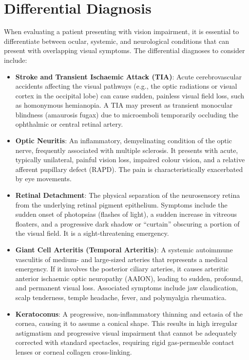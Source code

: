 \section*{Differential Diagnosis}
When evaluating a patient presenting with vision impairment, it is essential to differentiate between ocular, systemic, and neurological conditions that can present with overlapping visual symptoms. The differential diagnoses to consider include:
\begin{itemize}
    \item \textbf{Stroke and Transient Ischaemic Attack (TIA)}: Acute cerebrovascular accidents affecting the visual pathways (e.g., the optic radiations or visual cortex in the occipital lobe) can cause sudden, painless visual field loss, such as homonymous hemianopia. A TIA may present as transient monocular blindness (amaurosis fugax) due to microemboli temporarily occluding the ophthalmic or central retinal artery.
    \item \textbf{Optic Neuritis}: An inflammatory, demyelinating condition of the optic nerve, frequently associated with multiple sclerosis. It presents with acute, typically unilateral, painful vision loss, impaired colour vision, and a relative afferent pupillary defect (RAPD). The pain is characteristically exacerbated by eye movements.
    \item \textbf{Retinal Detachment}: The physical separation of the neurosensory retina from the underlying retinal pigment epithelium. Symptoms include the sudden onset of photopsias (flashes of light), a sudden increase in vitreous floaters, and a progressive dark shadow or ``curtain'' obscuring a portion of the visual field. It is a sight-threatening emergency.
    \item \textbf{Giant Cell Arteritis (Temporal Arteritis)}: A systemic autoimmune vasculitis of medium- and large-sized arteries that represents a medical emergency. If it involves the posterior ciliary arteries, it causes arteritic anterior ischaemic optic neuropathy (AAION), leading to sudden, profound, and permanent visual loss. Associated symptoms include jaw claudication, scalp tenderness, temple headache, fever, and polymyalgia rheumatica.
    \item \textbf{Keratoconus}: A progressive, non-inflammatory thinning and ectasia of the cornea, causing it to assume a conical shape. This results in high irregular astigmatism and progressive visual impairment that cannot be adequately corrected with standard spectacles, requiring rigid gas-permeable contact lenses or corneal collagen cross-linking.

\end{itemize}
